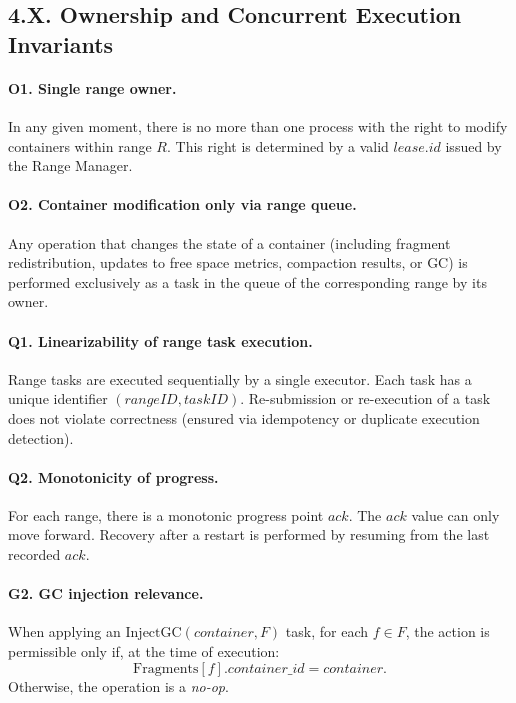 \documentclass[a4paper,12pt]{article}
\begin{document}
    \subsection*{4.X. Ownership and Concurrent Execution Invariants}

    \paragraph{O1. Single range owner.}
    In any given moment, there is no more than one process with the right to modify containers within range $R$. This right is determined by a valid $lease.id$ issued by the Range Manager.

    \paragraph{O2. Container modification only via range queue.}
    Any operation that changes the state of a container (including fragment redistribution, updates to free space metrics, compaction results, or GC) is performed exclusively as a task in the queue of the corresponding range by its owner.

    \paragraph{Q1. Linearizability of range task execution.}
    Range tasks are executed sequentially by a single executor. Each task has a unique identifier $(rangeID, taskID)$. Re-submission or re-execution of a task does not violate correctness (ensured via idempotency or duplicate execution detection).

    \paragraph{Q2. Monotonicity of progress.}
    For each range, there is a monotonic progress point $ack$. The $ack$ value can only move forward. Recovery after a restart is performed by resuming from the last recorded $ack$.

    \paragraph{G2. GC injection relevance.}
    When applying an $\mathrm{InjectGC}(container, F)$ task, for each $f \in F$, the action is permissible only if, at the time of execution:
    \[
        \mathrm{Fragments}[f].container\_id = container.
    \]
    Otherwise, the operation is a \emph{no-op}.
\end{document}
